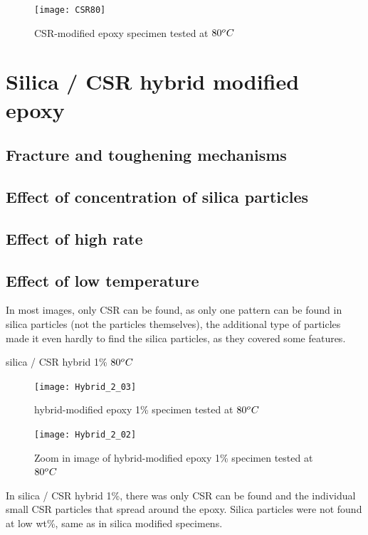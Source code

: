 \documentclass[numbers=noendperiod,chapterprefix=on]{icldt} %
\begin{document}
\begin{figure}[!htpb]
\centering
\texttt{[image: CSR80]}
\caption{CSR-modified epoxy specimen tested at  $\-80 ^oC$}\label{CSR80}
\end{figure}
\FloatBarrier

\section{Silica / CSR hybrid modified epoxy}

\subsection{Fracture and toughening mechanisms}

\subsection{Effect of concentration of silica particles}

\subsection{Effect of high rate}

\subsection{Effect of low temperature}

In most images, only CSR can be found, as only one pattern can be found in silica particles (not the particles themselves), the additional type of particles made it even hardly to find the silica particles, as they covered some features.

silica / CSR hybrid 1\% $\-80 ^oC$

\begin{figure}[!htpb]
\centering
\texttt{[image: Hybrid\_2\_03]}
\caption{hybrid-modified epoxy 1\% specimen tested at  $\-80 ^oC$}\label{Hybrid_2_03}
\end{figure}
\FloatBarrier

\begin{figure}[!htpb]
\centering
\texttt{[image: Hybrid\_2\_02]}
\caption{Zoom in image of hybrid-modified epoxy 1\% specimen tested at  $\-80 ^oC$}\label{Hybrid_2_02}
\end{figure}
\FloatBarrier

In silica / CSR hybrid 1\%, there was only CSR can be found and the individual small CSR particles that spread around the epoxy. Silica particles were not found at low wt\%, same as in silica modified specimens.
\end{document}
